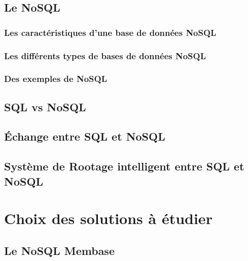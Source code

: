      \section{Le \textsf{NoSQL}}
     

               \subsection{Les caractéristiques d'une base de données \textsf{NoSQL}}
               

               \subsection{Les différents types de bases de données \textsf{NoSQL}}\label{categorie} 
                

               \subsection{Des exemples de \textsf{NoSQL}}
               

     \section{\textsf{SQL} vs \textsf{NoSQL}}
     

     \section{Échange entre \textsf{SQL} et \textsf{NoSQL}}
     

     \section{Système de Rootage intelligent entre \textsf{SQL} et \textsf{NoSQL}}
     

\chapter{Choix des solutions à étudier}

     
     \section{Le \textsf{NoSQL Membase}}
     

